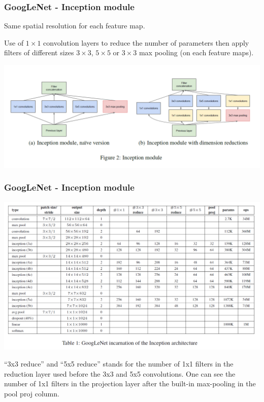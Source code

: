 \begin{frame}
	\frametitle{GoogLeNet - Inception module}

	Same spatial resolution for each feature map.

	\smallskip

	Use of $1\times 1$ convolution layers to reduce the number of parameters then apply filters of different sizes $3 \times 3$, $5 \times 5$ or $3 \times 3$ max pooling (on each feature maps).



\begin{center}
	\includegraphics[scale=0.65]{figs/GoogLeNet_inception_module}
\end{center}



\end{frame}

\begin{frame}
	\frametitle{GoogLeNet - Inception module}

	\vspace{-0.8cm}

	\begin{center}
		\includegraphics[scale=0.6]{figs/GoogLeNet_structure}
	\end{center}

	{\footnotesize ``3x3 reduce'' and ``5x5 reduce'' stands for the number of 1x1 filters in the reduction
	layer used before the 3x3 and 5x5 convolutions. One can see the number of 1x1 filters in the projection
	layer after the built-in max-pooling in the pool proj column.}

\end{frame}

